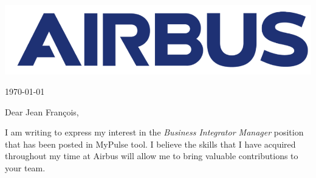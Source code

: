 \documentclass[11pt,a4paper]{letter}
\begin{document}
\thispagestyle{empty}

\vspace{0pt}

\begin{center}
\includegraphics[scale=0.1]{Images/airbus_blue_logo.png}
\end{center}
\vspace{20pt}

\hspace*{\fill} \longdate\today 


\vspace{10pt}



Dear Jean Fran\c cois,

\vspace{10pt}

I am writing to express my interest in the \textit{Business Integrator Manager} position that has been posted in MyPulse tool. I believe the skills that I have acquired throughout my time at Airbus will allow me to bring valuable contributions to your team.
\end{document}
